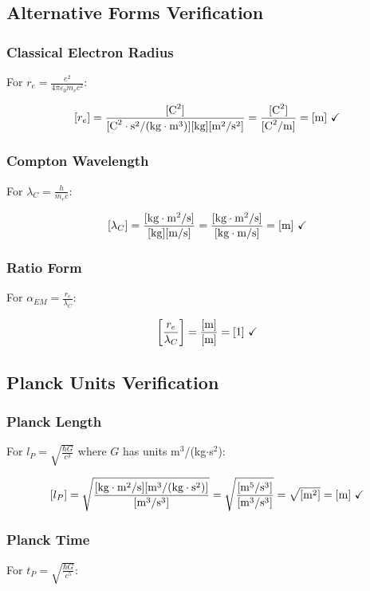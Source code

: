 \documentclass[12pt,a4paper]{article}
\begin{document}
	\subsection{Alternative Forms Verification}
	
	\subsubsection{Classical Electron Radius}
	For $r_e = \frac{e^2}{4\pi\varepsilon_0 m_e c^2}$:
	
	$$[r_e] = \frac{[\text{C}^2]}{[\text{C}^2\cdot\text{s}^2/(\text{kg}\cdot\text{m}^3)][\text{kg}][\text{m}^2/\text{s}^2]} = \frac{[\text{C}^2]}{[\text{C}^2/\text{m}]} = [\text{m}] \text{ \checkmark}$$
	
	\subsubsection{Compton Wavelength}
	For $\lambda_C = \frac{h}{m_e c}$:
	
	$$[\lambda_C] = \frac{[\text{kg}\cdot\text{m}^2/\text{s}]}{[\text{kg}][\text{m/s}]} = \frac{[\text{kg}\cdot\text{m}^2/\text{s}]}{[\text{kg}\cdot\text{m/s}]} = [\text{m}] \text{ \checkmark}$$
	
	\subsubsection{Ratio Form}
	For $\alpha_{EM} = \frac{r_e}{\lambda_C}$:
	
	$$\left[\frac{r_e}{\lambda_C}\right] = \frac{[\text{m}]}{[\text{m}]} = [1] \text{ \checkmark}$$
	
	\subsection{Planck Units Verification}
	
	\subsubsection{Planck Length}
	For $l_P = \sqrt{\frac{\hbar G}{c^3}}$ where $G$ has units m$^3$/(kg$\cdot$s$^2$):
	
	$$[l_P] = \sqrt{\frac{[\text{kg}\cdot\text{m}^2/\text{s}][\text{m}^3/(\text{kg}\cdot\text{s}^2)]}{[\text{m}^3/\text{s}^3]}} = \sqrt{\frac{[\text{m}^5/\text{s}^3]}{[\text{m}^3/\text{s}^3]}} = \sqrt{[\text{m}^2]} = [\text{m}] \text{ \checkmark}$$
	
	\subsubsection{Planck Time}
	For $t_P = \sqrt{\frac{\hbar G}{c^5}}$:
	
\end{document}

